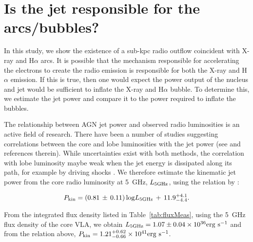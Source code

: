 \documentclass[fleqn,usenatbib]{mnras}
\def\tab{Table}
\begin{document}

\section{Is the jet responsible for the arcs/bubbles?}
\label{sec:jet_pwr}

{In this study, we show the existence of a sub-kpc radio outflow coincident with X-ray and H$\alpha$ arcs. It is possible that the mechanism responsible for accelerating the electrons to create the radio emission is responsible for both the X-ray and H$\alpha$ emission. If this is true, then one would expect the power output of the nucleus and jet would be sufficient to inflate the X-ray and H$\alpha$ bubble. }To determine this, we estimate the jet power and compare it to the power required to inflate the bubbles.

{The relationship between AGN jet power and observed radio luminosities is an active field of 
research. There have been a number of studies suggesting correlations between the core and lobe 
luminosities with the jet power (see \citealt{MH07,BF2011,GS2016} and references therein). While uncertainties exist with both methods,  the correlation with lobe luminosity maybe weak when the jet energy is dissipated along its path, for example by driving shocks \citep{GS2016}. We therefore estimate the kinematic jet power from the core radio luminosity at 5~GHz, $L_{5 \rm GHz}$, using the 
relation by \cite{MH07}:} 

\begin{equation}
P_{\rm kin} = (0.81\,\pm\,0.11)\,{\rm log}L_{5 \rm GHz}\, +\, 11.9^{+4.1}_{-4.4}.
\end{equation}

From the integrated flux density listed in \tab~\ref{tab:fluxMeas}, using the 5~GHz flux density of the core VLA, we obtain  
$L_{5 \rm GHz} = 1.07 \pm 0.04 \times 10^{36} {\rm erg~s^{-1}}$ and from the relation above, $P_{\rm 
kin} = 1.21^{+0.62}_{-0.66} \times 10^{41} {\rm erg~s^{-1}}$. 
\end{document}

